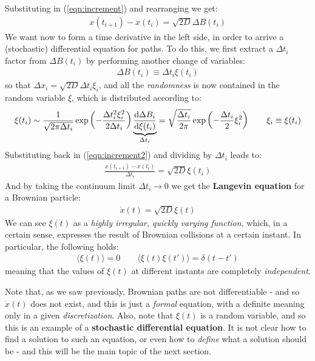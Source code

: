 \documentclass[../template.tex]{subfiles}
\begin{document}
Substituting in (\ref{eqn:increment}) and rearranging we get:
\begin{align}
    x(t_{i+1}) - x(t_i) = \sqrt{2 D} \Delta B(t_i)  \label{eqn:increment2}
\end{align}
We want now to form a time derivative in the left side, in order to arrive a (stochastic) differential equation for paths. To do this, we first extract a $\Delta t_i$ factor from $\Delta B(t_i)$ by performing another change of variables:
\begin{align}
    \Delta B(t_i) \equiv \Delta t_i \xi(t_i) 
    \label{eqn:deltaB}
\end{align}  
so that $\Delta x_i = \sqrt{2D} \Delta t_i \xi_i$, and all the \textit{randomness} is now contained in the random variable $\xi$, which is distributed according to:
\begin{align*}
    \xi(t_i) \sim \frac{1}{\sqrt{2 \pi \Delta t_i}} \exp\left(-\frac{\Delta t_i^2 \xi_i^2}{2 \Delta t_i} \right) \underbrace{\dv{\Delta B_i}{\xi (t_i)}}_{\Delta t_i} = \sqrt{\frac{\Delta t_i}{2 \pi} } \exp\left(-\frac{\Delta t_i }{2} \xi_i^2 \right) \qquad \xi_i \equiv \xi(t_i)  
\end{align*}   
Substituting back in (\ref{eqn:increment2}) and dividing by $\Delta t_i$ leads to:
\begin{align*}
    \frac{x(t_{i+1})-x(t_i)}{\Delta t_i}  = \sqrt{2D} \xi(t_i)
\end{align*}
And by taking the continuum limit $\Delta t_i \to 0$ we get the \textbf{Langevin equation} for a Brownian particle:
\begin{align}
    \dot{x}(t) = \sqrt{2D} \xi(t)
    \label{eqn:langevin1}
\end{align}
We can see $\xi(t)$ as a \textit{highly irregular, quickly varying function}, which, in a certain sense, expresses the result of Brownian collisions at a certain instant. In particular, the following holds:
\begin{align*}
    \langle \xi(t) \rangle = 0 \qquad \langle \xi(t) \xi(t') \rangle = \delta(t-t')
\end{align*}
meaning that the values of $\xi(t)$ at different instants are completely \textit{independent}. 
\medskip

Note that, as we saw previously, Brownian paths are not differentiable - and so $\dot{x}(t)$ does not exist, and this is just a \textit{formal} equation, with a definite meaning only in a given \textit{discretization}. Also, note that $\xi(t)$ is a random variable, and so this is an example of a \textbf{stochastic differential equation}. It is not clear how to find a solution to such an equation, or even how to \textit{define} what a solution should be - and this will be the main topic of the next section.
\end{document}
